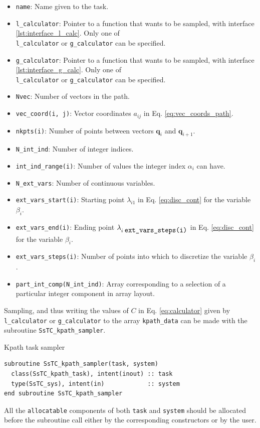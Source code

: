 \documentclass[10pt,a4paper]{article}
\begin{document}
\begin{tcolorbox}
\begin{itemize}
\item \verb|name|: Name given to the task.
\item \verb|l_calculator|: Pointer to a function that wants to be sampled, with interface \ref{lst:interface_l_calc}. Only one of \\ \verb|l_calculator| or \verb|g_calculator| can be specified.
\item \verb|g_calculator|: Pointer to a function that wants to be sampled, with interface \ref{lst:interface_g_calc}. Only one of \\ \verb|l_calculator| or \verb|g_calculator| can be specified.
\item \verb|Nvec|: Number of vectors in the path.
\item \verb|vec_coord(i, j)|: Vector coordinates $a_{ij}$ in Eq. \eqref{eq:vec_coords_path}.
\item \verb|nkpts(i)|: Number of points between vectors $\bm{q}_i$ and $\bm{q}_{i+1}$.
\item \verb|N_int_ind|: Number of integer indices.
\item \verb|int_ind_range(i)|: Number of values the integer index $\alpha_i$ can have.
\item \verb|N_ext_vars|: Number of continuous variables.
\item \verb|ext_vars_start(i)|: Starting point $\lambda_{i1}$ in Eq. \eqref{eq:disc_cont} for the variable $\beta_i$.
\item \verb|ext_vars_end(i)|: Ending point $\lambda_{i\;\verb|ext_vars_steps(i)|}$ in Eq. \eqref{eq:disc_cont} for the variable $\beta_i$.
\item \verb|ext_vars_steps(i)|: Number of points into which to discretize the variable $\beta_i$.
\item \verb|part_int_comp(N_int_ind)|: Array corresponding to a selection of a particular integer component in array layout.
\end{itemize}
\end{tcolorbox}
Sampling, and thus writing the values of $C$ in Eq. \eqref{eq:calculator} given by \verb|l_calculator| or \verb|g_calculator| to the array \verb|kpath_data| can be made with the subroutine \verb|SsTC_kpath_sampler|.
\begin{codebox}{Kpath task sampler}
\begin{lstlisting}[caption={Interface of the kpath task sampler.},captionpos=b]
subroutine SsTC_kpath_sampler(task, system)
  class(SsTC_kpath_task), intent(inout) :: task
  type(SsTC_sys), intent(in)            :: system
end subroutine SsTC_kpath_sampler
\end{lstlisting}
\end{codebox}
All the \verb|allocatable| components of both \verb|task| and \verb|system| should be allocated before the subroutine call either by the corresponding constructors or by the user.
\end{document}
